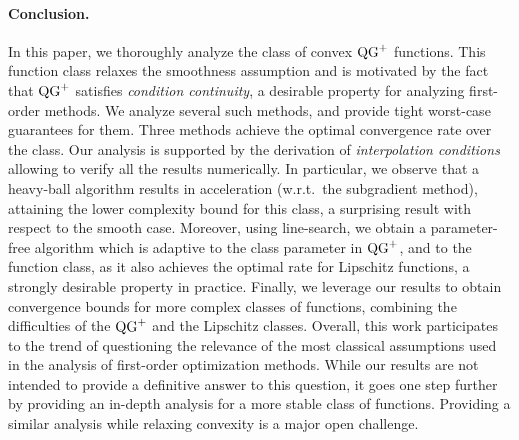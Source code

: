         \paragraph{Conclusion.}
        In this paper, we thoroughly analyze the class of convex $\operatorname{QG}^+$ functions.
        This function class relaxes the smoothness assumption and is motivated by the fact that $\operatorname{QG}^+$ satisfies \textit{condition continuity}, a desirable property for analyzing first-order methods.
        We analyze several such methods, and provide tight worst-case guarantees for them.
        Three methods achieve the optimal convergence rate over the class.
        Our analysis is supported by the derivation of \textit{interpolation conditions} allowing to verify all the results numerically.
        In particular, we observe that a heavy-ball algorithm results in acceleration (w.r.t.~the subgradient method), attaining the lower complexity bound for this class, a surprising result with respect to the smooth case.
        Moreover, using line-search, we obtain a parameter-free algorithm which is adaptive to the class parameter in $\operatorname{QG}^+$, and to the function class, as it also achieves the optimal rate for Lipschitz functions, a strongly desirable property in practice.
        Finally, we leverage our results to obtain convergence bounds for more complex classes of functions, combining the difficulties of the $\operatorname{QG}^+$ and the Lipschitz classes.
        Overall, this work participates to the trend of questioning the relevance of the most classical assumptions used in the analysis of first-order optimization methods.
        While our results are not intended to provide a definitive answer to this question, it goes one step further by providing an in-depth analysis for a more stable class of functions.
        Providing a similar analysis while relaxing convexity is a major open challenge.
